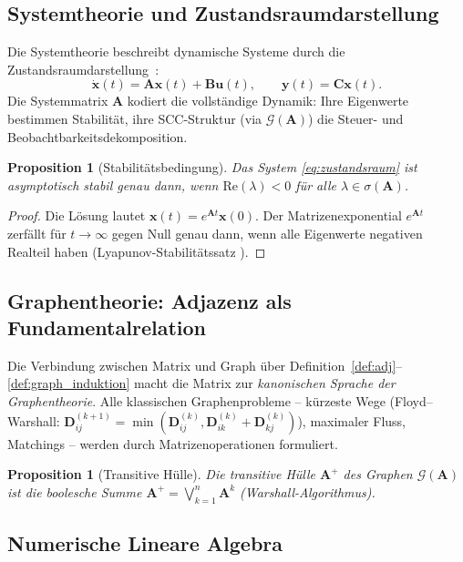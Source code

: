 ﻿\documentclass[12pt, a4paper]{article}
\newtheorem{proposition}[theorem]{Proposition}
\theoremstyle{definition}
\theoremstyle{remark}
\newcommand{\vx}{\bm{x}}
\newcommand{\vu}{\bm{u}}
\newcommand{\vy}{\bm{y}}
\newcommand{\vA}{\bm{A}}
\newcommand{\vB}{\bm{B}}
\newcommand{\vC}{\bm{C}}
\newcommand{\vD}{\bm{D}}
\newcommand{\spec}{\sigma}
\newcommand{\re}{\mathrm{Re}}
\begin{document}
\subsection{Systemtheorie und Zustandsraumdarstellung}
\label{subsec:system}

Die Systemtheorie beschreibt dynamische Systeme durch die
Zustandsraumdarstellung~\citep{epp2026sysstate}:
\begin{equation}
  \dot{\vx}(t) = \vA\vx(t) + \vB\vu(t), \qquad \vy(t) = \vC\vx(t).
  \label{eq:zustandsraum}
\end{equation}
Die Systemmatrix $\vA$ kodiert die vollständige Dynamik: Ihre Eigenwerte
bestimmen Stabilität, ihre SCC-Struktur (via $\mathcal{G}(\vA)$) die
Steuer- und Beobachtbarkeitsdekomposition.

\begin{proposition}[Stabilitätsbedingung]
Das System \eqref{eq:zustandsraum} ist asymptotisch stabil genau dann,
wenn $\re(\lambda) < 0$ für alle $\lambda \in \spec(\vA)$.
\end{proposition}

\begin{proof}
Die Lösung lautet $\vx(t) = e^{\vA t}\vx(0)$. Der Matrizenexponential
$e^{\vA t}$ zerfällt für $t \to \infty$ gegen Null genau dann, wenn alle
Eigenwerte negativen Realteil haben (Lyapunov-Stabilitätssatz
\citep{lyapunov1892,khalil2002}).
\end{proof}

\subsection{Graphentheorie: Adjazenz als Fundamentalrelation}
\label{subsec:graph_anw}

Die Verbindung zwischen Matrix und Graph über
Definition~\ref{def:adj}--\ref{def:graph_induktion} macht die Matrix zur
\emph{kanonischen Sprache der Graphentheorie}. Alle klassischen
Graphenprobleme -- kürzeste Wege (Floyd--Warshall: $\vD^{(k+1)}_{ij} =
\min(\vD^{(k)}_{ij}, \vD^{(k)}_{ik} + \vD^{(k)}_{kj})$),
maximaler Fluss, Matchings -- werden durch Matrizenoperationen formuliert.

\begin{proposition}[Transitive Hülle]
Die \emph{transitive Hülle} $\vA^+$ des Graphen $\mathcal{G}(\vA)$ ist
die boolesche Summe $\vA^+ = \bigvee_{k=1}^n \vA^k$ (Warshall-Algorithmus).
\end{proposition}

\subsection{Numerische Lineare Algebra}
\label{subsec:numerik}
\end{document}
